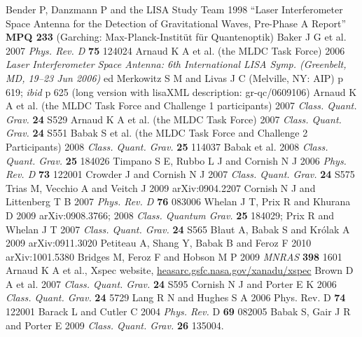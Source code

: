 \documentclass{iopart}
\begin{document}
\begin{thebibliography}{99}
%
 Bender P, Danzmann P and the LISA Study Team 1998 ``Laser Interferometer Space Antenna for the Detection of Gravitational Waves, Pre-Phase A Report'' \textbf{MPQ 233} (Garching: Max-Planck-Instit\"ut f\"ur Quantenoptik) 
%
 Baker J G et al. 2007 \textit{Phys. Rev. D} \textbf{75} 124024
%
 Arnaud K A et al. (the MLDC Task Force) 2006 \textit{Laser Interferometer Space Antenna: 6th International LISA Symp. (Greenbelt, MD, 19--23 Jun 2006)} ed Merkowitz S M and Livas J C (Melville, NY: AIP) p 619; \textit{ibid} p 625 (long version with lisaXML description: gr-qc/0609106)
%
 Arnaud K A et al. (the MLDC Task Force and Challenge 1 participants) 2007 \textit{Class. Quant. Grav.} \textbf{24} S529
%
 Arnaud K A et al. (the MLDC Task Force) 2007 \textit{Class. Quant. Grav.} \textbf{24} S551
%
 Babak S et al. (the MLDC Task Force and Challenge 2 Participants) 2008 \textit{Class. Quant. Grav.} \textbf{25} 114037
%
 Babak et al. 2008 \textit{Class. Quant. Grav.} \textbf{25} 184026
%
 Timpano S E, Rubbo L J and Cornish N J 2006 \textit{Phys. Rev. D} \textbf{73} 122001
%
 Crowder J and Cornish N J 2007 \textit{Class. Quant. Grav.}  \textbf{24} S575
%
 Trias M, Vecchio A and Veitch J 2009 arXiv:0904.2207 
%
 Cornish N J and Littenberg T B 2007 \textit{Phys. Rev. D} \textbf{76} 083006
%
 Whelan J T, Prix R and Khurana D 2009 arXiv:0908.3766;
2008 \textit{Class. Quantum Grav.} \textbf{25} 184029;
Prix R and Whelan J T 2007 \textit{Class. Quant. Grav.} \textbf{24} S565 
%
 B{\l}aut A, Babak S and Kr{\'o}lak A 2009 arXiv:0911.3020
%
 Petiteau A, Shang Y, Babak B and Feroz F 2010 arXiv:1001.5380
%
 Bridges M, Feroz F and Hobson M P 2009 \textit{MNRAS} \textbf{398} 1601
%
 Arnaud K A et al., Xspec website, \url{heasarc.gsfc.nasa.gov/xanadu/xspec}
%
 Brown D A et al. 2007 \textit{Class. Quant. Grav.} \textbf{24} S595  
%
 Cornish N J and Porter E K 2006 \textit{Class. Quant. Grav.} \textbf{24} 5729
%
 Lang R N and Hughes S A 2006 Phys. Rev. D \textbf{74} 122001
%
 Barack L and Cutler C 2004 \textit{Phys. Rev.} D \textbf{69} 082005
%
 Babak S, Gair J R and Porter E 2009 \textit{Class. Quant. Grav.} \textbf{26} 135004.

\end{thebibliography}
\end{document}
